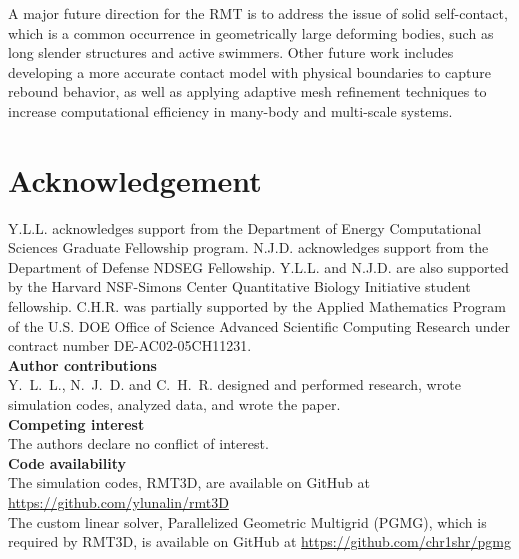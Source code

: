 \documentclass[times, 10pt]{article}
\begin{document}
\begin{multicols}{2}
A major future direction for the RMT is to address the issue of solid self-contact,
which is a common occurrence in geometrically large deforming bodies, such as long slender structures and active swimmers.
Other future work includes developing a more accurate contact model with physical boundaries to capture rebound behavior,
as well as applying adaptive mesh refinement techniques to increase computational efficiency in many-body and multi-scale systems.

\section*{Acknowledgement}
Y.L.L. acknowledges support from the Department of Energy Computational Sciences Graduate Fellowship program.
N.J.D. acknowledges support from the Department of Defense NDSEG Fellowship. Y.L.L. and N.J.D. are also supported by the Harvard NSF-Simons Center Quantitative Biology Initiative student fellowship.
C.H.R. was partially supported by the Applied Mathematics Program of the
U.S. DOE Office of Science Advanced Scientific Computing Research under
contract number DE-AC02-05CH11231.\\

\noindent
\textbf{Author contributions}\\
Y.~L.~L., N.~J.~D. and C.~H.~R. designed and performed research, wrote simulation codes, analyzed data, and wrote the paper.\\

\noindent
\textbf{Competing interest}\\
The authors declare no conflict of interest.\\

\noindent
\textbf{Code availability}\\
The simulation codes, RMT3D, are  available on GitHub at
\url{https://github.com/ylunalin/rmt3D}
\\
The custom linear solver, Parallelized Geometric Multigrid (PGMG), which is required by RMT3D, is available on GitHub at
\url{https://github.com/chr1shr/pgmg}



\end{multicols}
\end{document}
